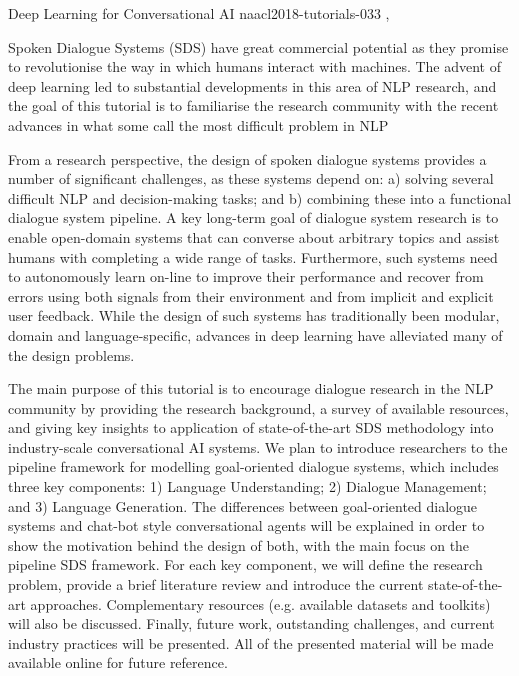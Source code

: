\begin{tutorial}
  {Deep Learning for Conversational AI}
  {naacl2018-tutorials-033}
  {\daydateyear, \tutorialafternoontime}
  {\TutLocF}
\end{tutorial}

Spoken Dialogue Systems (SDS) have great commercial potential as they promise to revolutionise the way in which humans interact with machines. The advent of deep learning led to substantial developments in this area of NLP research, and the goal of this tutorial is to familiarise the research community with the recent advances in what some call the most difficult problem in NLP

From a research perspective, the design of spoken dialogue systems provides a number of significant challenges, as these systems depend on: a) solving several difficult NLP and decision-making tasks; and b) combining these into a functional dialogue system pipeline. A key long-term goal of dialogue system research is to enable open-domain systems that can converse about arbitrary topics and assist humans with completing a wide range of tasks. Furthermore, such systems need to autonomously learn on-line to improve their performance and recover from errors using both signals from their environment and from implicit and explicit user feedback. While the design of such systems has traditionally been modular, domain and language-specific, advances in deep learning have alleviated many of the design problems.

The main purpose of this tutorial is to encourage dialogue research in the NLP community by providing the research background, a survey of available resources, and giving key insights to application of state-of-the-art SDS methodology into industry-scale conversational AI systems. We plan to introduce researchers to the pipeline framework for modelling goal-oriented dialogue systems, which includes three key components: 1) Language Understanding; 2) Dialogue Management; and 3) Language Generation. The differences between goal-oriented dialogue systems and chat-bot style conversational agents will be explained in order to show the motivation behind the design of both, with the main focus on the pipeline SDS framework. For each key component, we will define the research problem, provide a brief literature review and introduce the current state-of-the-art approaches. Complementary resources (e.g. available datasets and toolkits) will also be discussed. Finally, future work, outstanding challenges, and current industry practices will be presented. All of the presented material will be made available online for future reference.

